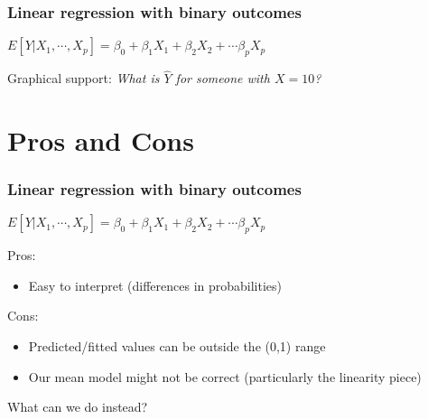 \documentclass{beamer}
\begin{document}
\begin{frame}[noframenumbering]
	\frametitle{Linear regression with binary outcomes}
	\begin{center} $E[Y|X_1,\cdots,X_p] = \beta_0 + \beta_1 X_1 + \beta_2 X_2 + \cdots \beta_p X_p$ \end{center}
	
	\color{blue} Graphical support: \color{black} \textit{What is $\hat{Y}$ for someone with $X = 10$?}
	\vspace{-0.55cm}
\end{frame}

\section{Pros and Cons}
\begin{frame}
	\frametitle{Linear regression with binary outcomes}
	\begin{center} $E[Y|X_1,\cdots,X_p] = \beta_0 + \beta_1 X_1 + \beta_2 X_2 + \cdots \beta_p X_p$ \end{center}
	
	Pros: \vspace{-0.3cm}
	\begin{itemize}
		\item Easy to interpret (differences in probabilities)
	\end{itemize}
	
	Cons: \vspace{-0.3cm}
	\begin{itemize}
		\item Predicted/fitted values can be outside the (0,1) range
		\item Our mean model might not be correct (particularly the linearity piece)%
	\end{itemize}
	
	What can we do instead?
\end{frame}
\end{document}
